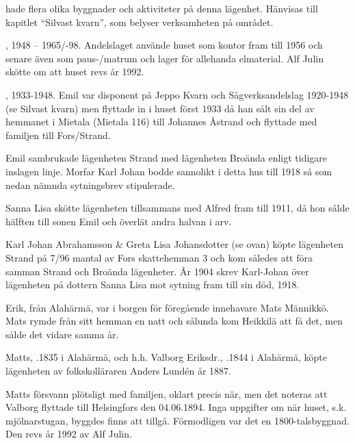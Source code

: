 


 hade flera olika byggnader och aktiviteter på denna lägenhet. Hänvisas till kapitlet ``Silvast kvarn'', som belyser verksamheten på området.


,
1948 – 1965/-98.
Andelslaget använde huset som kontor fram till 1956 och senare även som paus-/matrum och lager för allehanda elmaterial. Alf Julin skötte om att huset revs år 1992.


,
1933-1948.
Emil var disponent på Jeppo Kvarn och Sågverksandelslag 1920-1948 (se Silvast kvarn) men flyttade in i huset först 1933 då han sålt sin del av hemmanet i Mietala (Mietala 116) till Johannes Åstrand och flyttade med familjen till Fors/Strand.


Emil sambrukade lägenheten Strand med lägenheten Broända enligt tidigare inslagen linje. Morfar Karl Johan bodde sannolikt i detta hus till 1918 så som nedan nämnda sytningsbrev stipulerade.


Sanna Lisa skötte lägenheten tillsammans med Alfred fram till 1911,	då hon sålde hälften till sonen Emil och överlät andra halvan i arv.\jhvspace{}


Karl Johan Abrahamsson \& Greta Lisa Johansdotter (se ovan) köpte lägenheten Strand på 7/96 mantal av Fors skattehemman 3 och kom således att föra samman Strand och Broända lägenheter. År 1904 skrev Karl-Johan över lägenheten på dottern Sanna Lisa mot sytning fram till sin död, 1918.


Erik, från Alahärmä, var i borgen för föregående innehavare Mats Männikkö. Mats rymde från sitt hemman en natt och sålunda kom Heikkilä att få det, men sålde det vidare samma år.


Matts, .1835 i Alahärmä, och h.h. Valborg Eriksdr., .1844 i Alahärmä, köpte lägenheten av folkskolläraren Anders Lundén år 1887.
\begin{jhchildren}
  \item {}
  \item {}
  \item {}
  \item {}
  \item {}
\end{jhchildren}
Matts försvann plötsligt med familjen, oklart precis när, men det noteras att Valborg flyttade till Helsingfors den 04.06.1894. Inga uppgifter om när huset, s.k. mjölnarstugan, byggdes finns att tillgå. Förmodligen var det en 1800-talsbyggnad. Den revs år 1992 av Alf Julin.


